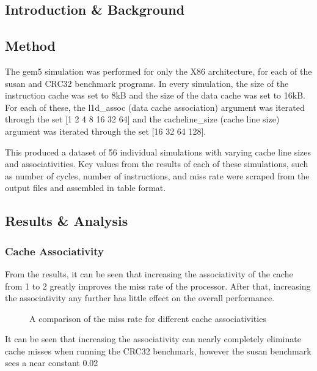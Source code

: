 
\subsection{Introduction \& Background}



\subsection{Method}

The gem5 simulation was performed for only the X86 architecture, for each of the 
susan and CRC32 benchmark programs. 
In every simulation, the size of the instruction cache was set to 8kB and the size 
of the data cache was set to 16kB.
For each of these, the l1d\_assoc (data cache association) argument was iterated 
through the set [1 2 4 8 16 32 64] and the cacheline\_size (cache line size) argument 
was iterated through the set [16 32 64 128].

This produced a dataset of 56 individual simulations with varying cache line sizes and 
associativities.
Key values from the results of each of these simulations, such as number of cycles, 
number of instructions, and miss rate were scraped from the output files and assembled 
in table format.

\subsection{Results \& Analysis}

\subsubsection{Cache Associativity}

From the results, it can be seen that increasing the associativity of the cache from 
1 to 2 greatly improves the miss rate of the processor. After that, increasing the 
associativity any further has little effect on the overall performance.

\begin{figure}
    \centering
    
    \caption{A comparison of the miss rate for different cache associativities}
    \label{fig:partb-assoc}
\end{figure}

It can be seen that increasing the associativity can nearly completely eliminate 
cache misses when running the CRC32 benchmark, however the susan benchmark sees a near 
constant 0.02%

